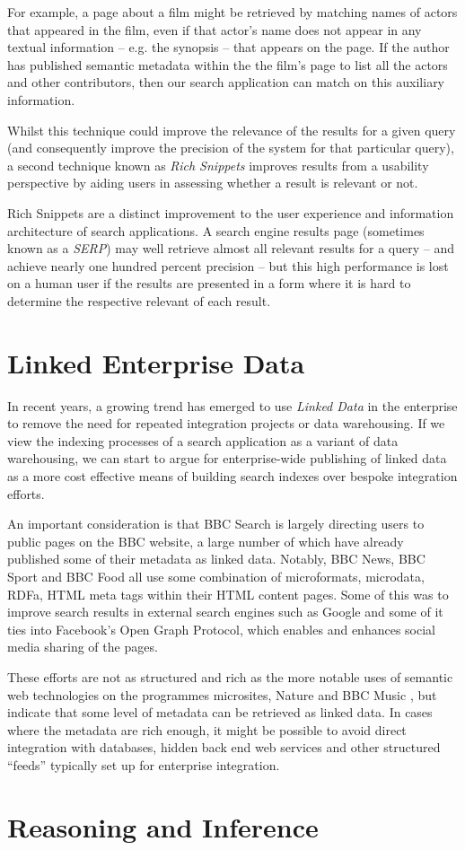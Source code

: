 For example, a page about a film might be retrieved
by matching names of actors that appeared in the film, even if that actor's
name does not appear in any textual information -- e.g. the synopsis --
that appears on the page. If the author has published semantic metadata
within the the film's page to list all the actors and other contributors,
then our search application can match on this auxiliary information.

Whilst this technique could improve the relevance of the results for a
given query (and consequently improve the precision of the system for that
particular query), a second technique known as \emph{Rich Snippets} improves
results from a usability perspective by aiding users in assessing whether
a result is relevant or not.

Rich Snippets are a distinct improvement 
to the user experience and information architecture
of search applications. A search engine results page (sometimes known as a
\emph{SERP}) may well retrieve almost all relevant results for a query -- and
achieve nearly one hundred percent precision -- but this high performance
is lost on a human user if the results are presented in a form where it is
hard to determine the respective relevant of each result.



\section{Linked Enterprise Data}

In recent years, a growing trend has emerged to use
\emph{Linked Data} in the enterprise to remove the need
for repeated integration projects or data warehousing.
\cite{allemang2010semantic} If we view the indexing processes
of a search application as a variant of data warehousing,
we can start to argue for enterprise-wide publishing of
linked data as a more cost effective means of building search
indexes over bespoke integration efforts.

An important consideration is that BBC Search is largely directing
users to public pages on the BBC website, a large number of which have
already published some of their metadata as linked data. Notably, BBC News,
BBC Sport and BBC Food all use some combination
of microformats, microdata, RDFa, HTML meta tags within their HTML content
pages. Some of this was to improve search results in external search engines
such as Google and some of it ties into Facebook's Open Graph Protocol, which
enables and enhances social media sharing of the pages.

These efforts are not as structured and rich as the more notable uses
of semantic web technologies on the programmes microsites, Nature and BBC
Music \cite{raimond2010use}, but indicate that some level of metadata
can be retrieved
as linked data. In cases where the metadata are rich enough, it might be
possible to avoid direct integration with databases, hidden back end
web services and other structured ``feeds'' typically set up for enterprise
integration.

\section{Reasoning and Inference}
